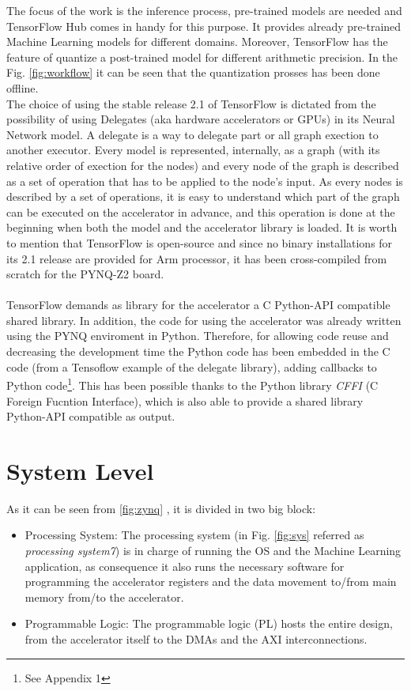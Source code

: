 The focus of the work is the inference process, pre-trained models are needed and TensorFlow Hub \cite{WEBSITE:5} comes in handy for this purpose. It provides already pre-trained Machine Learning models for different domains. Moreover, TensorFlow has the feature of quantize a post-trained model for different arithmetic precision. In the Fig. \ref{fig:workflow} it can be seen that the quantization prosses has been done offline.\\
The choice of using the stable release 2.1 of TensorFlow is dictated from the possibility of using Delegates (aka hardware accelerators or GPUs) in its Neural Network model. A delegate is a way to delegate part or all graph exection to another executor. Every model is represented, internally, as a graph (with its relative order of exection for the nodes) and every node of the graph is described as a set of operation that has to be applied to the node's input. As every nodes is described by a set of operations, it is easy to understand which part of the graph can be executed on the accelerator in advance, and this operation is done at the beginning when both the model and the accelerator library is loaded. It is worth to mention that TensorFlow is open-source and since no binary installations for its 2.1 release are provided for Arm processor, it has been cross-compiled from scratch for the PYNQ-Z2 board. \\\\

TensorFlow demands as library for the accelerator a C Python-API compatible shared library. In addition, the code for using the accelerator was already written using the PYNQ enviroment in Python. Therefore, for allowing code reuse and  decreasing the development time the Python code has been embedded in the C code (from a Tensoflow example of the delegate library), adding callbacks to Python code\footnote{See Appendix 1}. This has been possible thanks to the Python library \textit{CFFI} (C Foreign Fucntion Interface)\cite{WEBSITE:14}, which is also able to provide a shared library Python-API compatible as output.


\newpage
\section{System Level}

As it can be seen from \ref{fig:zynq} , it is divided in two big block:
\begin{itemize}
\item Processing System:
The processing system (in Fig. \ref{fig:sys} referred as \textit{processing system7}) is in charge of running the OS and the Machine Learning application, as consequence it also runs the necessary software for programming the accelerator registers and the data movement to/from main memory from/to the accelerator.
\item Programmable Logic:
The programmable logic (PL) hosts the entire design, from the accelerator itself to the DMAs and the AXI interconnections.
\end{itemize}

